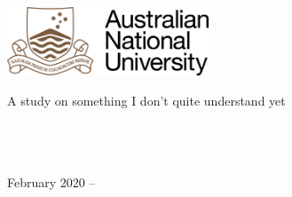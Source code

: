 
\begin{titlepage}

\begin{addmargin}[-1cm]{-3cm}
\begin{center}
\large

\hfill
\vfill

\begingroup
\color{Maroon} \\ \bigskip %
\endgroup


\vfill

\includegraphics[width=6cm]{Figures/ANU_Logo} \\ \bigskip %

A study on something I don't quite understand yet \\ \bigskip \bigskip %
\myDegree \\
\myDepartment \\
\myUni \\ 
\bigskip \bigskip

February 2020 -- \myVersion %

\vfill

\end{center}
\end{addmargin}

\end{titlepage}